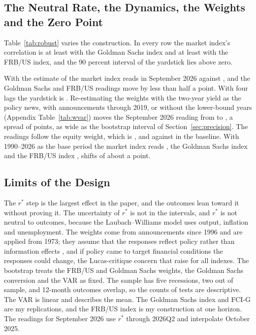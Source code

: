 \documentclass[11pt]{article}
\newcommand{\rs}{r^{*}}
\begin{document}
\begin{appendices}


\subsection{The Neutral Rate, the Dynamics, the Weights and the Zero Point}\label{sec:robother}
Table~\ref{tab:robust} varies the construction. In every row the market index's correlation is at least  with the Goldman Sachs index and at least  with the FRB/US index, and the 90 percent interval of the yardstick lies above zero.



With the estimate of \citet{kiley2020} the market index reads  in September 2026 against , and the Goldman Sachs and FRB/US readings move by less than half a point. With four lags the yardstick is . Re-estimating the weights with the two-year yield as the policy news, with announcements through 2019, or without the lower-bound years (Appendix Table~\ref{tab:wvar}) moves the September 2026 reading from  to , a spread of  points, as wide as the bootstrap interval of Section~\ref{sec:precision}. The readings follow the equity weight, which is ,  and  against  in the baseline. With 1990--2026 as the base period the market index reads , the Goldman Sachs index  and the FRB/US index , shifts of about a point.

\subsection{Limits of the Design}\label{sec:limits}
The $\rs$ step is the largest effect in the paper, and the outcomes lean toward it without proving it. The uncertainty of $\rs$ is not in the intervals, and $\rs$ is not neutral to outcomes, because the Laubach--Williams model uses output, inflation and unemployment. The weights come from announcements since 1996 and are applied from 1973; they assume that the responses reflect policy rather than information effects \citep{nakamura2018}, and if policy came to target financial conditions the responses could change, the Lucas-critique concern that \citet{hatzius2010} raise for all indexes. The bootstrap treats the FRB/US and Goldman Sachs weights, the Goldman Sachs conversion and the VAR as fixed. The sample has five recessions, two out of sample, and 12-month outcomes overlap, so the counts of tests are descriptive. The VAR is linear and describes the mean. The Goldman Sachs index and FCI-G are my replications, and the FRB/US index is my construction at one horizon. The readings for September 2026 use $\rs$ through 2026Q2 and interpolate October 2025.



\end{appendices}
\end{document}
